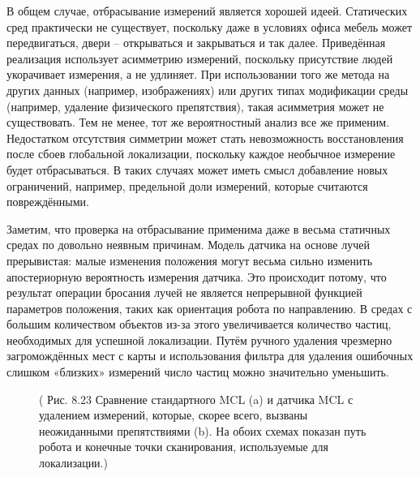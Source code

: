 \documentclass[10pt,a4paper]{article}
\begin{document}
В общем случае, отбрасывание измерений является хорошей идеей. Статических сред практически не существует, поскольку даже в  условиях офиса мебель может передвигаться, двери – открываться и закрываться и так далее. Приведённая реализация использует асимметрию измерений, поскольку присутствие людей укорачивает измерения, а не удлиняет. При использовании того же метода на других данных (например, изображениях) или других типах модификации среды (например, удаление физического препятствия), такая асимметрия может не существовать. Тем не менее, тот же вероятностный анализ все же применим. Недостатком отсутствия симметрии может стать невозможность восстановления после сбоев глобальной локализации, поскольку каждое необычное измерение будет отбрасываться. В таких случаях может иметь смысл добавление новых ограничений, например, предельной доли измерений, которые считаются повреждёнными. 

Заметим, что проверка на отбрасывание применима даже в весьма статичных средах по довольно неявным причинам. Модель датчика на основе лучей прерывистая: малые изменения положения могут весьма сильно изменить апостериорную вероятность измерения датчика. Это происходит потому, что результат операции бросания лучей не является непрерывной функцией параметров положения, таких как ориентация робота по направлению. В средах с большим количеством объектов из-за этого увеличивается количество частиц, необходимых для успешной локализации. Путём ручного удаления чрезмерно загромождённых мест с карты и использования фильтра для удаления ошибочных слишком «близких» измерений число частиц можно значительно уменьшить. 

\begin{figure}[H]
	\caption{ ( Рис. 8.23 Сравнение  стандартного MCL (a) и датчика MCL с удалением измерений, которые, скорее всего, вызваны неожиданными препятствиями (b). На обоих схемах показан путь робота и конечные точки сканирования, используемые для локализации.)}
	\label{fig:823orig}
\end{figure}
\end{document}
